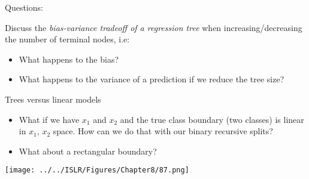 \documentclass[
  10pt,
  ignorenonframetext,
]{beamer}
\providecommand{\tightlist}{%
  \setlength{\itemsep}{0pt}\setlength{\parskip}{0pt}}
\begin{document}
\begin{frame}
\vspace{2mm}

\begin{block}{Questions:}
\protect\hypertarget{questions}{}
\vspace{2mm}

Discuss the \emph{bias-variance tradeoff of a regression tree} when
increasing/decreasing the number of terminal nodes, i.e:

\vspace{2mm}

\begin{itemize}
\tightlist
\item
  What happens to the bias?
\item
  What happens to the variance of a prediction if we reduce the tree
  size?
\end{itemize}
\end{block}
\end{frame}

\begin{frame}{Trees versus linear models}
\protect\hypertarget{trees-versus-linear-models}{}
\begin{itemize}
\item
  What if we have \(x_1\) and \(x_2\) and the true class boundary (two
  classes) is linear in \(x_1\), \(x_2\) space. How can we do that with
  our binary recursive splits?
\item
  What about a rectangular boundary?
\end{itemize}

\centering

\texttt{[image: ../../ISLR/Figures/Chapter8/87.png]}
\end{frame}
\end{document}
